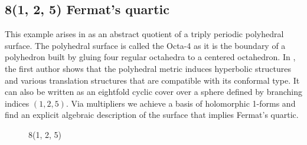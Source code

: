 \documentclass[12pt,reqno]{amsart}
\theoremstyle{definition}
\theoremstyle{remark}
\begin{document}
\subsection{8(1, 2, 5) Fermat's quartic}

This example arises in \cite{dami} as an abstract quotient of a triply periodic polyhedral surface. The polyhedral surface is called the Octa-4 as it is the boundary of a polyhedron built by gluing four regular octahedra to a centered octahedron. In \cite{dami}, the first author shows that the polyhedral metric induces hyperbolic structures and various translation structures that are compatible with its conformal type. It can also be written as an eightfold cyclic cover over a sphere defined by branching indices $(1, 2, 5).$ Via multipliers we achieve a basis of holomorphic 1-forms and find an explicit algebraic description of the surface that implies Fermat's quartic.  




\begin{figure}[htbp]
    \centering
    \qquad
    \caption{8(1, 2, 5)}%
    \label{fig:125}%
\end{figure}
\end{document}
